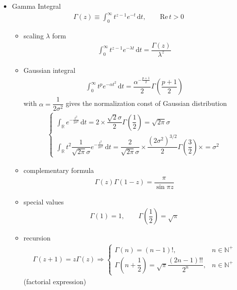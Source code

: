 \begin{itemize}[topsep=2pt,itemsep=0pt]
    \item Gamma Integral
    \begin{align*}
        \Gamma (z)\equiv \int_{0}^\infty t^{z-1}e^{-t}\,\mathrm{d}t,\qquad \mathrm{Re}\,t>0 
    \end{align*}
    \begin{itemize}[topsep=2pt,itemsep=0pt]
        \item scaling $ \lambda  $ form
    \begin{align*}
        \int_{0}^\infty t^{z-1}e^{-\lambda t}\,\mathrm{d}t=\dfrac{\Gamma (z)}{\lambda ^z}
    \end{align*}
    \item Gaussian integral
    \begin{align*}
        \int_0^\infty t^{p}e^{-\alpha t^2}\,\mathrm{d}t= \dfrac{\alpha^{-\frac{p+1}{2}}}{2} \Gamma(\dfrac{p+1}{2})
    \end{align*}
    with $ \alpha =\dfrac{1}{2\sigma ^2} $ gives the normalization const of Gaussian distribution
    \begin{align*}
        \begin{cases}
            \int_\mathbb{R}e^{-\frac{t^2}{2\sigma ^2}}\,\mathrm{d}t=2\times \dfrac{\sqrt{2}\sigma }{2}\Gamma (\dfrac{1}{2})={\sqrt{2\pi}\sigma }\\
            \int_\mathbb{R}t^2 \dfrac{1}{\sqrt{2\pi}\sigma }e^{-\frac{t^2}{2\sigma ^2}}\,\mathrm{d}t=\dfrac{2}{\sqrt{2\pi}\sigma  }\times \dfrac{(2\sigma^2 )^{3/2}}{2}\Gamma (\dfrac{3}{2})\times =\sigma ^2
        \end{cases}
    \end{align*}
    
    
    
    
    \item complementary formula
    \begin{align*}
        \Gamma (z)\Gamma (1-z)=\dfrac{\pi}{\sin \pi z} 
    \end{align*}
    \item special values
    \begin{align*}
        \Gamma (1)=1,\qquad \Gamma (\dfrac{1}{2})=\sqrt{\pi} 
    \end{align*}
    \item recursion 
    \begin{align*}
        \Gamma (z+1)=z\Gamma (z)\Rightarrow\begin{cases}
            \Gamma (n)=(n-1)!,&n\in\mathbb{N}^+\\
            \Gamma (n+\dfrac{1}{2})=\sqrt{\pi}\dfrac{(2n-1)!!}{2^n},&n\in\mathbb{N}^+
        \end{cases} 
    \end{align*}
    (factorial expression)
    \end{itemize}
    

\end{itemize}
